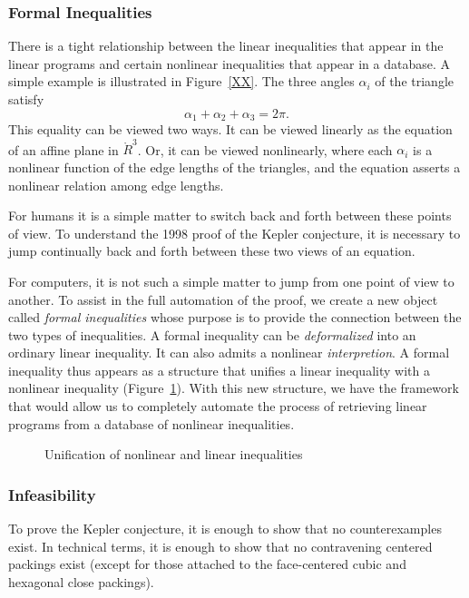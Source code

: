 \subsubsection{Formal Inequalities}

There is a tight relationship between the linear inequalities that
appear in the linear programs and certain nonlinear inequalities
that appear in a database.  A simple example is illustrated in
Figure~\ref{XX}.  The three angles $\alpha_i$ of the triangle
satisfy
    \begin{equation}
    \label{eqn:2pi}
    \alpha_1 + \alpha_2 + \alpha_3 = 2\pi.
    \end{equation}
This equality can be viewed two ways.  It can be viewed linearly
as the equation of an affine plane in $\ring{R}^3$.  Or, it can be
viewed nonlinearly, where each $\alpha_i$ is a nonlinear function
of the edge lengths of the triangles, and the equation asserts a
nonlinear relation among edge lengths.

For humans it is a simple matter to switch back and forth between
these points of view.  To understand the 1998 proof of the Kepler
conjecture, it is necessary to jump continually back and forth
between these two views of an equation.

For computers, it is not such a simple matter to jump from one
point of view to another.  To assist in the full automation of the
proof, we create a new object called {\it formal inequalities}
whose purpose is to provide the connection between the two types
of inequalities.  A formal inequality can be {\it deformalized}
into an ordinary linear inequality.  It can also admits a
nonlinear {\it interpretion}.  A formal inequality thus appears as
a structure that unifies a linear inequality with a nonlinear
inequality (Figure~\ref{fig:formal}). With this new structure, we
have the framework that would allow us to completely automate the
process of retrieving linear programs from a database of nonlinear
inequalities.

\begin{figure}[htb]
  \centering
  \caption{Unification of nonlinear and linear inequalities}
  \label{fig:formal}
\end{figure}

\subsubsection{Infeasibility}

To prove the Kepler conjecture, it is enough to show that no
counterexamples exist.  In technical terms, it is enough to show
that no contravening centered packings exist (except for those
attached to the face-centered cubic and hexagonal close packings).


